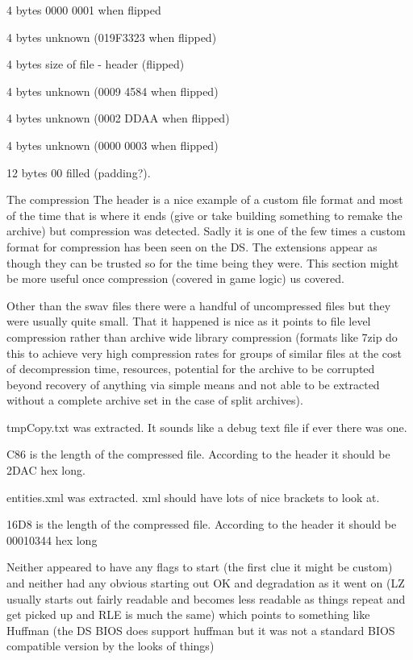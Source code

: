 \documentclass[
]{book}
\begin{document}
4 bytes 0000 0001 when flipped

4 bytes unknown (019F3323 when flipped)

4 bytes size of file - header (flipped)

4 bytes unknown (0009 4584 when flipped)

4 bytes unknown (0002 DDAA when flipped)

4 bytes unknown (0000 0003 when flipped)

12 bytes 00 filled (padding?).

The compression The header is a nice example of a custom file format and most of the time that is where it ends (give or take building something to remake the archive) but compression was detected. Sadly it is one of the few times a custom format for compression has been seen on the DS. The extensions appear as though they can be trusted so for the time being they were. This section might be more useful once compression (covered in game logic) us covered.

Other than the swav files there were a handful of uncompressed files but they were usually quite small. That it happened is nice as it points to file level compression rather than archive wide library compression (formats like 7zip do this to achieve very high compression rates for groups of similar files at the cost of decompression time, resources, potential for the archive to be corrupted beyond recovery of anything via simple means and not able to be extracted without a complete archive set in the case of split archives).

tmpCopy.txt was extracted. It sounds like a debug text file if ever there was one.

C86 is the length of the compressed file. According to the header it should be 2DAC hex long.

entities.xml was extracted. xml should have lots of nice brackets to look at.

16D8 is the length of the compressed file. According to the header it should be 00010344 hex long

Neither appeared to have any flags to start (the first clue it might be custom) and neither had any obvious starting out OK and degradation as it went on (LZ usually starts out fairly readable and becomes less readable as things repeat and get picked up and RLE is much the same) which points to something like Huffman (the DS BIOS does support huffman but it was not a standard BIOS compatible version by the looks of things)
\end{document}
